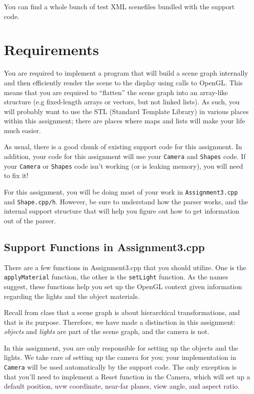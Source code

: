 \documentclass[10pt,twocolumn]{article}
\begin{document}
You can find a whole bunch of test XML scenefiles bundled with the support code.

\section{Requirements}
You are required to implement a program that will build a scene graph internally and then efficiently render the scene to the display using calls to OpenGL. This means that you are required to ``flatten'' the scene graph into an array-like structure (e.g fixed-length arrays or vectors, but not linked lists). As such, you will probably want to use the STL (Standard Template Library) in various places within this assignment; there are places where maps and lists will make your life much easier.

As usual, there is a good chunk of existing support code for this assignment. In addition, your code for this assignment will use your {\tt Camera} and {\tt Shapes} code. If your {\tt Camera} or {\tt Shapes} code isn't working (or is leaking memory), you will need to fix it!

For this assignment, you will be doing most of your work in {\tt Assignment3.cpp} and {\tt Shape.cpp/h}. However, be sure to understand how the parser works, and the internal support structure that will help you figure out how to get information out of the parser.

\subsection{Support Functions in Assignment3.cpp}
There are a few functions in Assignment3.cpp that you should utilize. One is the {\tt applyMaterial} function, the other is the {\tt setLight} function. As the names suggest, these functions help you set up the OpenGL context given information regarding the lights and the object materials.
 
Recall from class that a scene graph is about hierarchical transformations, and that is its purpose. Therefore, we have made a distinction in this assignment: \emph{objects} and \emph{lights} are part of the scene graph, and the camera is not.

In this assignment, you are only responsible for setting up the objects and the lights. We take care of setting up the camera for you; your implementation in {\tt Camera} will be used automatically by the support code. The only exception is that you'll need to implement a Reset function in the Camera, which will set up a default position, uvw coordinate, near-far planes, view angle, and aspect ratio.
\end{document}
